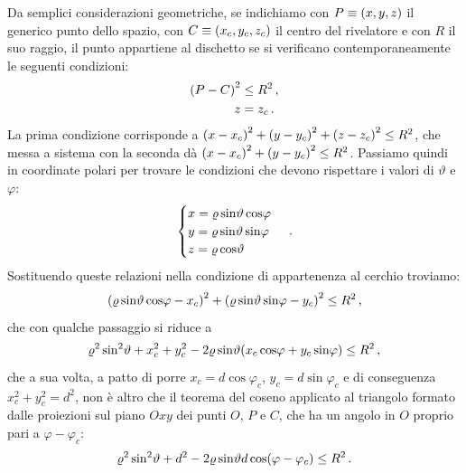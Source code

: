             Da semplici considerazioni geometriche, se indichiamo con $P\equiv\pqty{x,y,z}$ il generico punto dello spazio, con $C\equiv\pqty{x_c,y_c,z_c}$ il centro del rivelatore e con $R$ il suo raggio, il punto appartiene al dischetto se si verificano contemporaneamente le seguenti condizioni:
            \begin{align}
                \pqty{P - C}^2 &\leq R^2 \mycomma
                \label{eq:acc:cond-1}
                \\
                z &= z_c \myperiod
                \label{eq:acc:cond-2}
            \end{align}
            La prima condizione corrisponde a $\pqty{x - x_c}^2 + \pqty{y - y_c}^2 + \pqty{z - z_c}^2 \leq R^2$, che messa a sistema con la seconda dà $\pqty{x - x_c}^2 + \pqty{y - y_c}^2 \leq R^2$. Passiamo quindi in coordinate polari per trovare le condizioni che devono rispettare i valori di $\vartheta$ e $\varphi$:
            \begin{equation*}
                \begin{cases}
                    x = \varrho\sin\!\vartheta\cos\!\varphi \\
                    y = \varrho\sin\!\vartheta\sin\!\varphi \\
                    z = \varrho\cos\!\vartheta
                \end{cases}
                \,.
            \end{equation*}
            Sostituendo queste relazioni nella condizione di appartenenza al cerchio troviamo:
            \begin{equation*}
                \pqty{\varrho\sin\!\vartheta\cos\!\varphi - x_c}^2 + \pqty{\varrho\sin\!\vartheta\sin\!\varphi - y_c}^2 \leq R^2
                \mycomma
            \end{equation*}
            che con qualche passaggio si riduce a
            \begin{equation*}
               \varrho^2 \sin\!^2\vartheta + x_c^2 + y_c^2 - 2 \varrho\sin\!\vartheta\pqty{x_c\cos\!\varphi + y_c\sin\!\varphi} \leq R^2
               \mycomma
            \end{equation*}
            che a sua volta, a patto di porre $x_c = d\cos\!\varphi_c$, $y_c = d\sin\!\varphi_c$ e di conseguenza $x_c^2 + y_c^2 = d^2$, non è altro che il teorema del coseno applicato al triangolo formato dalle proiezioni sul piano $Oxy$ dei punti $O$, $P$ e $C$, che ha un angolo in $O$ proprio pari a $\varphi - \varphi_c$:
            \begin{equation}
                \varrho^2 \sin\!^2\vartheta + d^2 - 2 \varrho\sin\!\vartheta d \cos\!\pqty{\varphi - \varphi_c} \leq R^2
                \myperiod
                \label{eq:acc:cond-rho}
            \end{equation}
